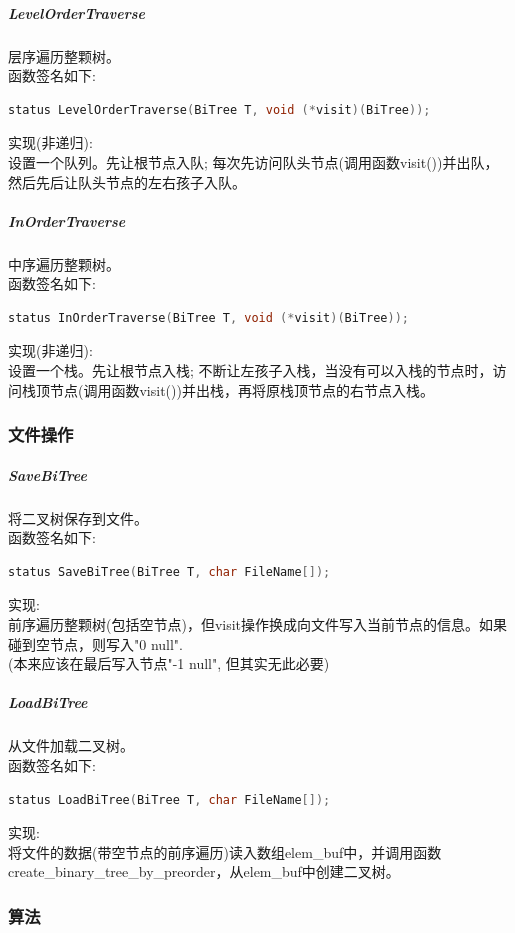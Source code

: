 \documentclass[supercite]{Experimental_Report}
\theoremstyle{definition}
\begin{document}
\subparagraph{LevelOrderTraverse}
\noindent
层序遍历整颗树。 \\
函数签名如下:
\begin{lstlisting}[language=C++, frame=single]
status LevelOrderTraverse(BiTree T, void (*visit)(BiTree));
\end{lstlisting}
实现(非递归): \\
设置一个队列。先让根节点入队; 每次先访问队头节点(调用函数visit())并出队，然后先后让队头节点的左右孩子入队。 \\

\subparagraph{InOrderTraverse}
\noindent
中序遍历整颗树。 \\
函数签名如下:
\begin{lstlisting}[language=C++, frame=single]
status InOrderTraverse(BiTree T, void (*visit)(BiTree));
\end{lstlisting}
实现(非递归): \\
设置一个栈。先让根节点入栈; 不断让左孩子入栈，当没有可以入栈的节点时，访问栈顶节点(调用函数visit())并出栈，再将原栈顶节点的右节点入栈。 \\

\subsubsection{文件操作}

\subparagraph{SaveBiTree}
\noindent
将二叉树保存到文件。 \\
函数签名如下:
\begin{lstlisting}[language=C++, frame=single]
status SaveBiTree(BiTree T, char FileName[]);
\end{lstlisting}
实现: \\
前序遍历整颗树(包括空节点)，但visit操作换成向文件写入当前节点的信息。如果碰到空节点，则写入"0 null". \\
(本来应该在最后写入节点"-1 null", 但其实无此必要) \\

\subparagraph{LoadBiTree}
\noindent
从文件加载二叉树。 \\
函数签名如下:
\begin{lstlisting}[language=C++, frame=single]
status LoadBiTree(BiTree T, char FileName[]);
\end{lstlisting}
实现: \\
将文件的数据(带空节点的前序遍历)读入数组elem\_buf中，并调用函数create\_binary\_tree\_by\_preorder，从elem\_buf中创建二叉树。 \\

\subsubsection{算法}
\end{document}
